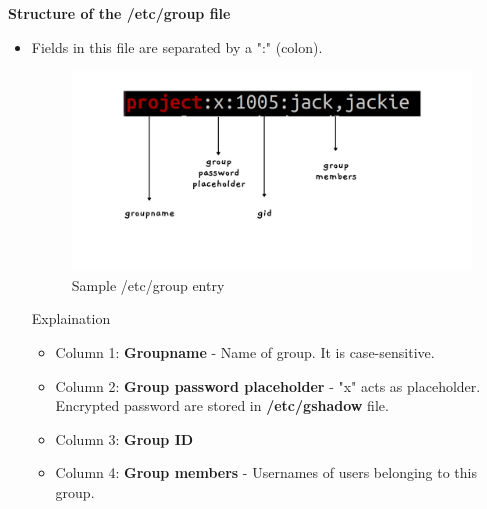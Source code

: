 \begin{flushleft}
\newpage

\textbf{Structure of the /etc/group file}
\begin{itemize}
	\item Fields in this file are separated by a ":" (colon).
	\begin{figure}[h!]
		\centering
		\includegraphics[scale=.2]{content/chapter4/images/54.png}
		\caption{Sample /etc/group entry}
		\label{fig:user_group}
	\end{figure}	
	\newline
	Explaination
	\begin{itemize}
		\item Column 1: \textbf{Groupname} - Name of group. It is case-sensitive. 
		\item Column 2: \textbf{Group password placeholder} - "x" acts as placeholder. Encrypted password are stored in \textbf{/etc/gshadow} file.
		\item Column 3: \textbf{Group ID} 
		\item Column 4: \textbf{Group members} - Usernames of users belonging to this group.
	\end{itemize}	
\end{itemize}	


\end{flushleft}
